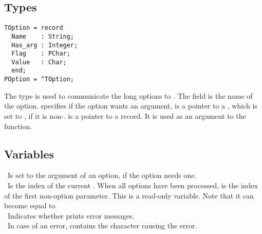 \subsection{Types}
\begin{verbatim}
TOption = record
  Name    : String;
  Has_arg : Integer;
  Flag    : PChar;
  Value   : Char;
  end;
POption = ^TOption;
\end{verbatim}
The  type is used to communicate the long options to .
The  field is the name of the option.  specifies if the option
wants an argument,  is a pointer to a , which is set to
, if it is non-. 
 is a pointer to a
 record. It is used as an argument to the 
function.
\subsection{Variables}
 \ Is set to the argument of an option, if the option needs
one.\\
 \ Is the index of the current . When
all options have been processed,  is the index of the first
non-option parameter. This is a read-only variable. Note that it can become
equal to \\
 \ Indicates whether  prints error
messages.\\
 \  In case of an error, contains the character causing the 
error.
